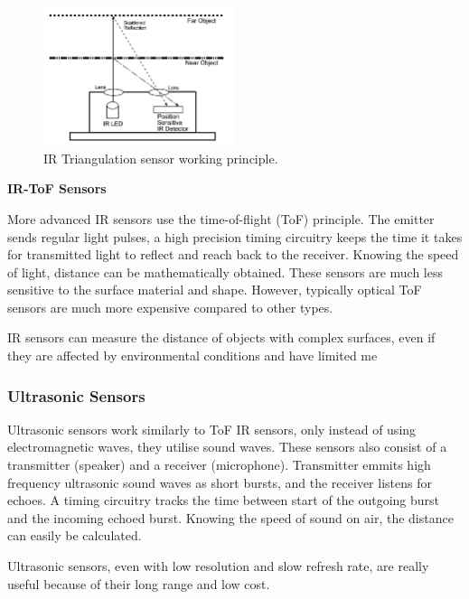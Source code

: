 \documentclass[12pt, a4paper]{article}
\begin{document}
                    \begin{figure}[H]\centering
                        \includegraphics[width=0.5\textwidth]{triangulation}
                        \caption[]{IR Triangulation sensor working principle.}\label{fig:triangulation}
                    \end{figure}
                
                \bigskip\noindent
                \textbf{IR-ToF Sensors}

                    More advanced IR sensors use the time-of-flight (ToF) principle. The emitter sends regular light pulses, a high precision timing circuitry keeps the time it takes for transmitted light to reflect and reach back to the receiver. Knowing the speed of light, distance can be mathematically obtained. These sensors are much less sensitive to the surface material and shape. However, typically optical ToF sensors are much more expensive compared to other types.

                IR sensors can measure the distance of objects with complex surfaces, even if they are affected by environmental conditions and have limited me

                    
            
            \subsubsection{Ultrasonic Sensors}
                Ultrasonic sensors work similarly to ToF IR sensors, only instead of using electromagnetic waves, they utilise sound waves. These sensors also consist of a transmitter (speaker) and a receiver (microphone). Transmitter emmits high frequency ultrasonic sound waves as short bursts, and the receiver listens for echoes. A timing circuitry tracks the time between start of the outgoing burst and the incoming echoed burst. Knowing the speed of sound on air, the distance can easily be calculated.

                Ultrasonic sensors, even with low resolution and slow refresh rate, are really useful because of their long range and low cost.
\end{document}

